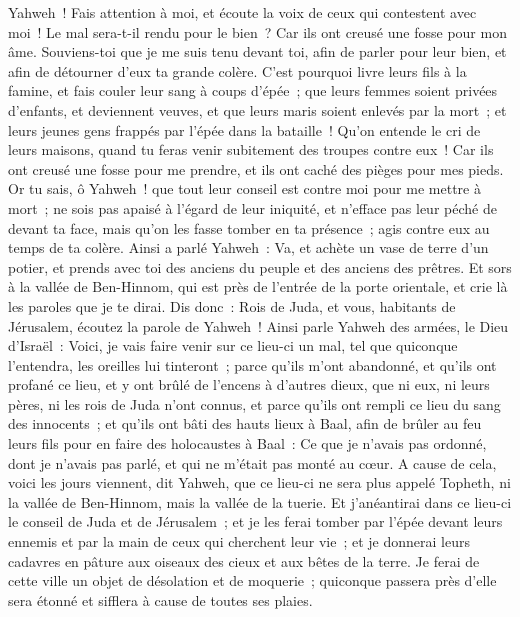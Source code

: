 \begin{multicols}{2}
Yahweh~! Fais attention à moi, et écoute la voix de ceux qui contestent avec moi~!
Le mal sera-t-il rendu pour le bien~? Car ils ont creusé une fosse pour mon âme. Souviens-toi que je me suis tenu devant toi, afin de parler pour leur bien, et afin de détourner d'eux ta grande colère.
C'est pourquoi livre leurs fils à la famine, et fais couler leur sang à coups d'épée~; que leurs femmes soient privées d'enfants, et deviennent veuves, et que leurs maris soient enlevés par la mort~; et leurs jeunes gens frappés par l'épée dans la bataille~!
Qu'on entende le cri de leurs maisons, quand tu feras venir subitement des troupes contre eux~! Car ils ont creusé une fosse pour me prendre, et ils ont caché des pièges pour mes pieds.
Or tu sais, ô Yahweh~! que tout leur conseil est contre moi pour me mettre à mort~; ne sois pas apaisé à l'égard de leur iniquité, et n'efface pas leur péché de devant ta face, mais qu'on les fasse tomber en ta présence~; agis contre eux au temps de ta colère.
\VerseOne{}Ainsi a parlé Yahweh~: Va, et achète un vase de terre d'un potier, et prends avec toi des anciens du peuple et des anciens des prêtres.
Et sors à la vallée de Ben-Hinnom, qui est près de l'entrée de la porte orientale, et crie là les paroles que je te dirai.
Dis donc~: Rois de Juda, et vous, habitants de Jérusalem, écoutez la parole de Yahweh~! Ainsi parle Yahweh des armées, le Dieu d'Israël~: Voici, je vais faire venir sur ce lieu-ci un mal, tel que quiconque l'entendra, les oreilles lui tinteront~;
parce qu'ils m'ont abandonné, et qu'ils ont profané ce lieu, et y ont brûlé de l'encens à d'autres dieux, que ni eux, ni leurs pères, ni les rois de Juda n'ont connus, et parce qu'ils ont rempli ce lieu du sang des innocents~;
et qu'ils ont bâti des hauts lieux à Baal, afin de brûler au feu leurs fils pour en faire des holocaustes à Baal~: Ce que je n'avais pas ordonné, dont je n'avais pas parlé, et qui ne m'était pas monté au cœur.
A cause de cela, voici les jours viennent, dit Yahweh, que ce lieu-ci ne sera plus appelé Topheth, ni la vallée de Ben-Hinnom, mais la vallée de la tuerie.
Et j'anéantirai dans ce lieu-ci le conseil de Juda et de Jérusalem~; et je les ferai tomber par l'épée devant leurs ennemis et par la main de ceux qui cherchent leur vie~; et je donnerai leurs cadavres en pâture aux oiseaux des cieux et aux bêtes de la terre.
Je ferai de cette ville un objet de désolation et de moquerie~; quiconque passera près d'elle sera étonné et sifflera à cause de toutes ses plaies.

\end{multicols}
